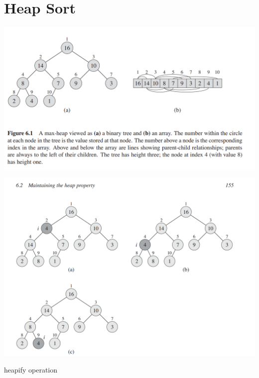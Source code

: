 \section{Heap Sort}

\includegraphics[width=\dimexpr\textwidth]{resources/sorting-max-heap-as-array.png}

\begin{marginfigure}
     
     \includegraphics[width=\marginparwidth]{resources/sorting-max-heap-heapify-operation.png}
     \caption{heapify operation}
\end{marginfigure}

